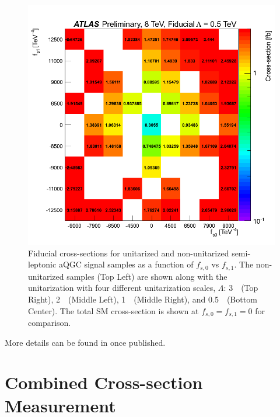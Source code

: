 \begin{figure}[ht]
\includegraphics[width=.45\textwidth]{figures/aQGC/2l2j_fiducial_p5TeV_noratio.png}
\caption{Fiducial cross-sections for unitarized and non-unitarized semi-leptonic 
aQGC signal samples as a function of $f_{s,0}$ vs $f_{s,1}$.
The non-unitarized samples (Top Left) are shown along with the unitarization with 
four different unitarization scales, $\Lambda$: 3~\TeV~(Top Right),
2~\TeV~(Middle Left), 1~\TeV~(Middle Right), and 0.5~\TeV~(Bottom Center).
The total SM cross-section is shown at $f_{s,0}=f_{s,1}=0$ for comparison.}
\label{fig:2l2j_aqgc_fiducial_xsec}
\end{figure}

More details can be found in \cite{wwwcomb} once published.

\section{Combined Cross-section Measurement}
\label{sec:combined_measurement}

